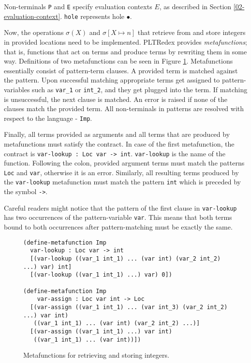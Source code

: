Non-terminals \texttt{P} and \texttt{E} specify evaluation contexts $E$, as described in Section \ref{02-evaluation-context}. \texttt{hole} represents hole $\bullet$.


Now, the operations $\sigma(X)$ and $\sigma[X \mapsto n]$ that retrieve from and store integers in provided locations need to be implemented. PLTRedex provides \textit{metafunctions}; that is, functions that act on terms and produce terms by rewriting them in some way. Definitions of two metafunctions can be seen in Figure \ref{imp-define-mf}. Metafunctions essentially consist of pattern-term clauses. A provided term is matched against the pattern. Upon successful matching appropriate terms get assigned to pattern-variables such as \texttt{var\_1} or \texttt{int\_2}, and they get plugged into the term. If matching is unsuccessful, the next clause is matched. An error is raised if none of the clauses match the provided term. All non-terminals in patterns are resolved with respect to the language - \texttt{Imp}.

Finally, all terms provided as arguments and all terms that are produced by metafunctions must satisfy the contract. In case of the first metafunction, the contract is \texttt{var-lookup : Loc var -> int}. \texttt{var-lookup} is the name of the function. Following the colon, provided argument terms must match the patterns \texttt{Loc} and \texttt{var}, otherwise it is an error. Similarly, all resulting terms produced by the \texttt{var-lookup} metafunction must match the pattern \texttt{int} which is preceded by the symbol \texttt{->}.

Careful readers might notice that the pattern of the first clause in \texttt{var-lookup} has two occurrences of the pattern-variable \texttt{var}. This means that both terms bound to both occurrences after pattern-matching must be exactly the same.

\begin{figure}[htb]
\begin{verbatim}
(define-metafunction Imp
  var-lookup : Loc var -> int
  [(var-lookup ((var_1 int_1) ... (var int) (var_2 int_2) ...) var) int]
  [(var-lookup ((var_1 int_1) ...) var) 0])

(define-metafunction Imp
    var-assign : Loc var int -> Loc 
  [(var-assign ((var_1 int_1) ... (var int_3) (var_2 int_2) ...) var int)
   ((var_1 int_1) ... (var int) (var_2 int_2) ...)]
  [(var-assign ((var_1 int_1) ...) var int)
   ((var_1 int_1) ... (var int))])
\end{verbatim}
\caption{Metafunctions for retrieving and storing integers.}
\label{imp-define-mf}
\end{figure}

